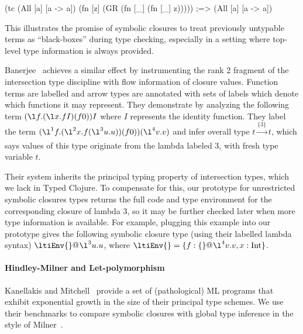 \documentclass[11pt,final]{iuthesis}
\begin{document}
\begin{cljlisting}
(tc (All [a] [a -> a])
    (fn [z]
      (GR (fn [_] (fn [_] z)))))
;=> (All [a] [a -> a])
\end{cljlisting}

This illustrates the promise of symbolic closures to treat previously untypable terms
as ``black-boxes'' during type checking, especially in a setting where top-level
type information is always provided.

Banerjee~\cite{banerjee1997modular}
achieves a similar effect by
instrumenting the rank 2 fragment of the intersection type discipline
with flow information of closure values.
Function terms are labelled and
arrow types are annotated with sets of labels which denote
which functions it may represent.
They demonstrate by analyzing the following term
$(\l f. (\l x. f I)(f 0))I$
where $I$ represents the identity function.
They label the term
$(\l^1 f. (\l^2 x. f (\l^3 u. u))(f 0))(\l^4 v. v)$
and infer overall type
$t \xrightarrow[]{\{3\}} t$,
which says values of this type originate from the lambda labeled $3$,
with fresh type variable $t$.

Their system inherits the principal typing property of intersection
types, which we lack in Typed Clojure.
To compensate for this, our prototype for unrestricted symbolic closures
types returns the full code and type environment for the corresponding closure
of lambda $3$, so it may
be further checked later when more type information is available.
For example, plugging this example into our prototype gives the
following symbolic closure type (using their labelled lambda syntax)
$\ltiClosure{\ltiEnv{}}{\l^3 u. u}$,
where $\ltiEnv{} = \{f : \ltiClosure{\{\}}{\l^4 v. v}, x : \text{Int}\}$.



\paragraph{Hindley-Milner and Let-polymorphism}
%
Kanellakis and Mitchell~\cite{kanellakis1989polymorphic}
provide a set of (pathological) ML programs that exhibit exponential
growth in the size of their principal type schemes.
We use their benchmarks to compare symbolic closures with
global type inference in the style of Milner~\cite{milner1978theory}.
\end{document}

